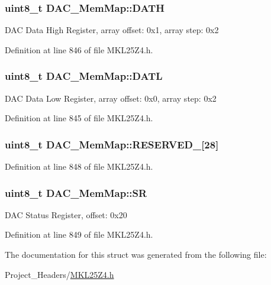 \subsubsection[{\texorpdfstring{D\+A\+TH}{DATH}}]{\setlength{\rightskip}{0pt plus 5cm}uint8\+\_\+t D\+A\+C\+\_\+\+Mem\+Map\+::\+D\+A\+TH}\hypertarget{struct_d_a_c___mem_map_ab05302bfcc5f26e258870c56bbdb52b8}{}\label{struct_d_a_c___mem_map_ab05302bfcc5f26e258870c56bbdb52b8}
D\+AC Data High Register, array offset\+: 0x1, array step\+: 0x2 

Definition at line 846 of file M\+K\+L25\+Z4.\+h.

\subsubsection[{\texorpdfstring{D\+A\+TL}{DATL}}]{\setlength{\rightskip}{0pt plus 5cm}uint8\+\_\+t D\+A\+C\+\_\+\+Mem\+Map\+::\+D\+A\+TL}\hypertarget{struct_d_a_c___mem_map_a5e154a0937bc5d4879efb1fd80f713f0}{}\label{struct_d_a_c___mem_map_a5e154a0937bc5d4879efb1fd80f713f0}
D\+AC Data Low Register, array offset\+: 0x0, array step\+: 0x2 

Definition at line 845 of file M\+K\+L25\+Z4.\+h.

\subsubsection[{\texorpdfstring{R\+E\+S\+E\+R\+V\+E\+D\+\_\+0}{RESERVED_0}}]{\setlength{\rightskip}{0pt plus 5cm}uint8\+\_\+t D\+A\+C\+\_\+\+Mem\+Map\+::\+R\+E\+S\+E\+R\+V\+E\+D\+\_\mbox{[}28\mbox{]}}\hypertarget{struct_d_a_c___mem_map_a96f86316418a3a382f0552a7e2f4b3c1}{}\label{struct_d_a_c___mem_map_a96f86316418a3a382f0552a7e2f4b3c1}


Definition at line 848 of file M\+K\+L25\+Z4.\+h.

\subsubsection[{\texorpdfstring{SR}{SR}}]{\setlength{\rightskip}{0pt plus 5cm}uint8\+\_\+t D\+A\+C\+\_\+\+Mem\+Map\+::\+SR}\hypertarget{struct_d_a_c___mem_map_a146115dd60e5e34ce6f1d8dc2b860877}{}\label{struct_d_a_c___mem_map_a146115dd60e5e34ce6f1d8dc2b860877}
D\+AC Status Register, offset\+: 0x20 

Definition at line 849 of file M\+K\+L25\+Z4.\+h.



The documentation for this struct was generated from the following file\+:\begin{DoxyCompactItemize}
\item 
Project\+\_\+\+Headers/\hyperlink{_m_k_l25_z4_8h}{M\+K\+L25\+Z4.\+h}\end{DoxyCompactItemize}
